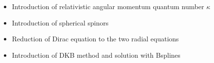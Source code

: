
\begin{itemize}
\item Introduction of relativistic angular momentum quantum number $\kappa$
\item Introduction of spherical spinors
\item Reduction of Dirac equation to the two radial equations
\item Introduction of DKB method and solution with Bsplines
\end{itemize}
